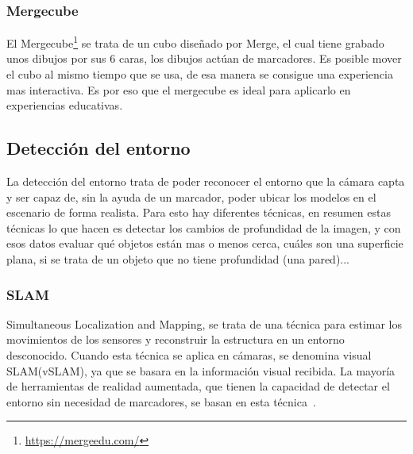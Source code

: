 







\subsubsection{Mergecube}\label{section:mergecube}

El Mergecube\footnote{\url{https://mergeedu.com/}} se trata de un cubo diseñado por Merge, el cual tiene grabado unos dibujos por sus 6 caras, los dibujos actúan de marcadores. Es posible mover el cubo al mismo tiempo que se usa, de esa manera se consigue una experiencia mas interactiva. Es por eso que el mergecube es ideal para aplicarlo en experiencias educativas.


\subsection{Detección del entorno}

La detección del entorno trata de poder reconocer el entorno que la cámara capta y ser capaz de, sin la ayuda de un marcador, poder ubicar los modelos en el escenario de forma realista.
Para esto hay diferentes técnicas, en resumen estas técnicas lo que hacen es detectar los cambios de profundidad de la imagen, y con esos datos evaluar qué objetos están mas o menos cerca, cuáles son una superficie plana, si se trata de un objeto que no tiene profundidad (una pared)...

\subsubsection{SLAM}

Simultaneous Localization and Mapping, se trata de una técnica para estimar los movimientos de los sensores y reconstruir la estructura en un entorno desconocido. Cuando esta técnica se aplica en cámaras, se denomina visual SLAM(vSLAM), ya que se basara en la información visual recibida.
La mayoría de herramientas de realidad aumentada, que tienen la capacidad de detectar el entorno sin necesidad de marcadores, se basan en esta técnica~\cite{taketomi2017visual}.

